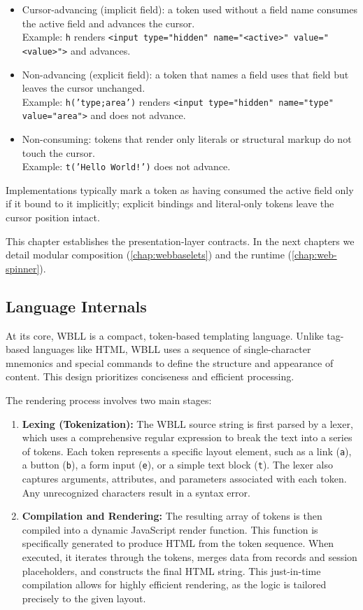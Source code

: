 \begin{itemize}
  \item Cursor-advancing (implicit field): a token used without a field name consumes the active field and advances the cursor.\\
  Example: \texttt{h} renders \texttt{<input type="hidden" name="<active>" value="<value>">} and advances.
  \item Non-advancing (explicit field): a token that names a field uses that field but leaves the cursor unchanged.\\
  Example: \texttt{h('type;area')} renders \texttt{<input type="hidden" name="type" value="area">} and does not advance.
  \item Non-consuming: tokens that render only literals or structural markup do not touch the cursor.\\
  Example: \texttt{t('Hello World!')} does not advance.
\end{itemize}

Implementations typically mark a token as having consumed the active field only if it bound to it implicitly; explicit bindings and literal-only tokens leave the cursor position intact.

This chapter establishes the presentation-layer contracts. In the next chapters we detail modular composition (\cref{chap:webbaselets}) and the runtime (\cref{chap:web-spinner}).

\subsection{Language Internals}

At its core, WBLL is a compact, token-based templating language. Unlike tag-based languages like HTML, WBLL uses a sequence of single-character mnemonics and special commands to define the structure and appearance of content. This design prioritizes conciseness and efficient processing.

The rendering process involves two main stages:

\begin{enumerate}
    \item \textbf{Lexing (Tokenization):} The WBLL source string is first parsed by a lexer, which uses a comprehensive regular expression to break the text into a series of tokens. Each token represents a specific layout element, such as a link (\texttt{a}), a button (\texttt{b}), a form input (\texttt{e}), or a simple text block (\texttt{t}). The lexer also captures arguments, attributes, and parameters associated with each token. Any unrecognized characters result in a syntax error.
    
    \item \textbf{Compilation and Rendering:} The resulting array of tokens is then compiled into a dynamic JavaScript render function. This function is specifically generated to produce HTML from the token sequence. When executed, it iterates through the tokens, merges data from records and session placeholders, and constructs the final HTML string. This just-in-time compilation allows for highly efficient rendering, as the logic is tailored precisely to the given layout.
\end{enumerate}


